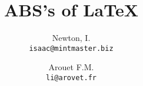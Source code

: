 \documentclass[12pt, a4paper]{article}
\title{ABS's of LaTeX}
\author{
  Newton, I.\\
  \texttt{isaac@mintmaster.biz}
  \and
  Arouet F.M.\\
  \texttt{li@arovet.fr}
}
\begin{document}
%

\maketitle






\printbibliography{}
\end{document}
